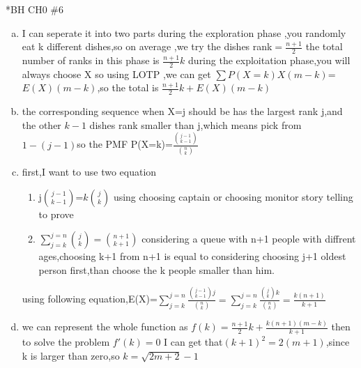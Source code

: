 \documentclass{article}
\begin{document}
\begin{homeworkProblem}*{BH CH0 \#6}
\begin{enumerate}[(a)]
	\item I can seperate it into two parts during the exploration phase ,you randomly eat k different  dishes,so on average ,we try the dishes rank$=\frac{n+1}{2}$ the total number of ranks in this phase is $\frac{n+1}{2}k$ during the exploitation phase,you will always choose X so using LOTP ,we can get $\sum P(X=k)X(m-k)$=$E(X)(m-k)$,so the total is $\frac{n+1}{2}k+E(X)(m-k)$
	\item the corresponding sequence  when X=j should be has the largest rank j,and the other $k-1$ dishes rank smaller than  j,which means pick from $1-(j-1)$so the PMF P(X=k)=$\frac{\binom{j-1}{k-1}}{\binom{n}{k}}$
	\item  first,I want to use two equation\begin{enumerate}[i]
	\item j$\binom{j-1}{k-1}$=$k\binom{j}{k}$ using choosing captain or choosing monitor story telling to prove
	\item  $\sum\limits_{j=k}^{j=n}\binom{j}{k}=\binom{n+1}{k+1}$ considering a queue with n+1 people with diffrent ages,choosing k+1 from n+1 is equal to considering choosing j+1 oldest person first,than choose the k people smaller than him.
 
	\end{enumerate}
	using following equation,E(X)=$\sum\limits_{j=k}^{j=n}\frac{\binom{j-1}{k-1}j}{\binom{n}{k}}=\sum\limits_{j=k}^{j=n}\frac{\binom{j}{k}k}{\binom{n}{k}}=\frac{k(n+1)}{k+1}$ 
\item we can represent the whole function as $f(k)=\frac{n+1}{2}k+\frac{k(n+1)(m-k)}{k+1}$ 
then to solve the problem $f'(k)=0$ I can get that$(k+1)^2=2(m+1)$,since k is larger than zero,so $k=\sqrt {2m+2}-1$
\end{enumerate}
\end{homeworkProblem}
\end{document}
